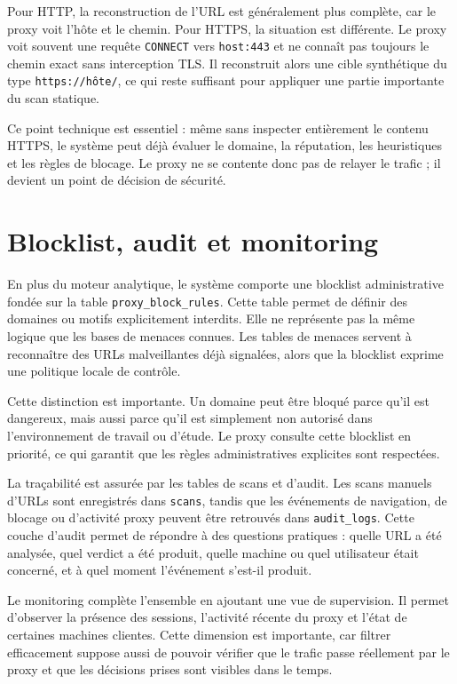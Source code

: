 ﻿\documentclass[12pt,a4paper]{report}
\begin{document}
Pour HTTP, la reconstruction de l'URL est généralement plus complète, car le proxy voit l'hôte et le chemin. Pour HTTPS, la situation est différente. Le proxy voit souvent une requête \texttt{CONNECT} vers \texttt{host:443} et ne connaît pas toujours le chemin exact sans interception TLS. Il reconstruit alors une cible synthétique du type \texttt{https://hôte/}, ce qui reste suffisant pour appliquer une partie importante du scan statique.

Ce point technique est essentiel : même sans inspecter entièrement le contenu HTTPS, le système peut déjà évaluer le domaine, la réputation, les heuristiques et les règles de blocage. Le proxy ne se contente donc pas de relayer le trafic ; il devient un point de décision de sécurité.

\chapter{Blocklist, audit et monitoring}

En plus du moteur analytique, le système comporte une blocklist administrative fondée sur la table \texttt{proxy\_block\_rules}. Cette table permet de définir des domaines ou motifs explicitement interdits. Elle ne représente pas la même logique que les bases de menaces connues. Les tables de menaces servent à reconnaître des URLs malveillantes déjà signalées, alors que la blocklist exprime une politique locale de contrôle.

Cette distinction est importante. Un domaine peut être bloqué parce qu'il est dangereux, mais aussi parce qu'il est simplement non autorisé dans l'environnement de travail ou d'étude. Le proxy consulte cette blocklist en priorité, ce qui garantit que les règles administratives explicites sont respectées.

La traçabilité est assurée par les tables de scans et d'audit. Les scans manuels d'URLs sont enregistrés dans \texttt{scans}, tandis que les événements de navigation, de blocage ou d'activité proxy peuvent être retrouvés dans \texttt{audit\_logs}. Cette couche d'audit permet de répondre à des questions pratiques : quelle URL a été analysée, quel verdict a été produit, quelle machine ou quel utilisateur était concerné, et à quel moment l'événement s'est-il produit.

Le monitoring complète l'ensemble en ajoutant une vue de supervision. Il permet d'observer la présence des sessions, l'activité récente du proxy et l'état de certaines machines clientes. Cette dimension est importante, car filtrer efficacement suppose aussi de pouvoir vérifier que le trafic passe réellement par le proxy et que les décisions prises sont visibles dans le temps.
\end{document}
